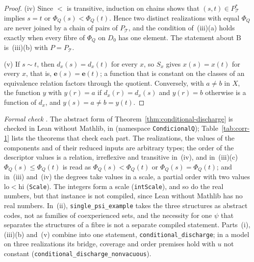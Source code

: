 \begin{proof}
(iv) Since $<$ is transitive, induction on chains shows that $(s,t)\in P_{\mathcal T}^\ast$ implies $s=t$ or $\Phi_Q(s)<\Phi_Q(t)$. Hence two distinct realizations with equal $\Phi_Q$ are never joined by a chain of pairs of $P_{\mathcal T}$, and the condition of~(iii)(a) holds exactly when every fibre of $\Phi_Q$ on $D_0$ has one element. The statement about $\mathrm B$ is~(iii)(b) with $P=P_{\mathcal T}$.

(v) If $s\sim t$, then $d_x(s)=d_x(t)$ for every $x$, so $S_x$ gives $x(s)=x(t)$ for every $x$, that is, $\mathbf e(s)=\mathbf e(t)$; a function that is constant on the classes of an equivalence relation factors through the quotient. Conversely, with $a\ne b$ in $X$, the function $y$ with $y(r)=a$ if $d_x(r)=d_x(s)$ and $y(r)=b$ otherwise is a function of $d_x$, and $y(s)=a\ne b=y(t)$.
\end{proof}
\emph{Formal check} \stL. The abstract form of Theorem~\ref{thm:conditional-discharge} is checked in Lean without Mathlib, in  (namespace \texttt{CondicionalQ}); Table~\ref{tab:corr-1} lists the theorems that check each part. The realizations, the values of the components and of their reduced inputs are arbitrary types; the order of the descriptor values is a relation, irreflexive and transitive in~(iv), and in~(iii)(c) $\Phi_Q(s)\le\Phi_Q(t)$ is read as $\Phi_Q(s)<\Phi_Q(t)$ or $\Phi_Q(s)=\Phi_Q(t)$; and in~(iii) and~(iv) the degrees take values in a scale, a partial order with two values $\mathrm{lo}<\mathrm{hi}$ (\texttt{Scale}). The integers form a scale (\texttt{intScale}), and so do the real numbers, but that instance is not compiled, since Lean without Mathlib has no real numbers. In~(ii), \texttt{single\_psi\_example} takes the three structures as abstract codes, not as families of coexperienced sets, and the necessity for one $\psi$ that separates the structures of a fibre is not a separate compiled statement. Parts~(i), (iii)(b) and~(v) combine into one statement, \texttt{conditional\_discharge}; in a model on three realizations its bridge, coverage and order premises hold with $u$ not constant (\texttt{conditional\_discharge\_nonvacuous}).

